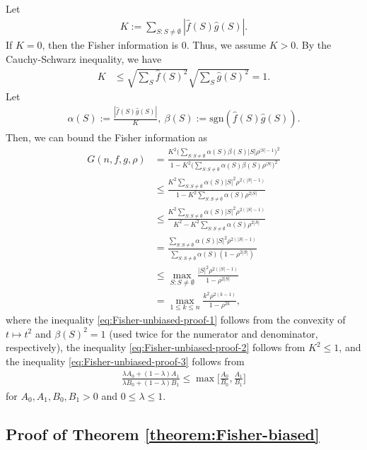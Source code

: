 \documentclass[journal,draftcls, onecolumn]{IEEEtran}
\newcommand{\qed}{\hfill \IEEEQED}
\newcommand{\rom}[1]{\mathrm{#1}}
\begin{document}
Let 
\begin{align}
K := \sum_{S: S\neq \emptyset}  |\widehat{f}(S) \widehat{g}(S)|.
\end{align}
If $K=0$, then the Fisher information is $0$. Thus, we assume $K > 0$. 
By the Cauchy-Schwarz inequality, we have
\begin{align}
K &\le \sqrt{\sum_S \widehat{f}(S)^2} \sqrt{\sum_S \widehat{g}(S)^2} =1.
\end{align}
Let 
\begin{align}
\alpha(S) := \frac{|\widehat{f}(S) \widehat{g}(S)|}{K},~\beta(S) := \rom{sgn}(\widehat{f}(S) \widehat{g}(S)).
\end{align}
Then, we can bound the Fisher information as
\begin{align}
G(n,f,g,\rho) &= \frac{K^2 \big(  \sum_{S: S\neq \emptyset} \alpha(S) \beta(S) |S|  \rho^{|S|-1}\big)^2}{1 - K^2 \big(\sum_{S: S\neq \emptyset} \alpha(S) \beta(S) \rho^{|S|}\big)^2} \\
&\le \frac{K^2 \sum_{S: S\neq \emptyset} \alpha(S)  |S|^2  \rho^{2(|S|-1)}}{1 - K^2 \sum_{S: S\neq \emptyset} \alpha(S)  \rho^{2|S|}} \label{eq:Fisher-unbiased-proof-1} \\
&\le \frac{K^2 \sum_{S: S\neq \emptyset} \alpha(S)  |S|^2  \rho^{2(|S|-1)}}{K^2 - K^2 \sum_{S: S\neq \emptyset} \alpha(S)  \rho^{2|S|}}  \label{eq:Fisher-unbiased-proof-2}  \\
&= \frac{ \sum_{S: S\neq \emptyset} \alpha(S)  |S|^2  \rho^{2(|S|-1)}}{  \sum_{S: S\neq \emptyset} \alpha(S) (1 -  \rho^{2|S|})} \\
&\le \max_{S: S\neq \emptyset} \frac{|S|^2 \rho^{2(|S|-1)}}{1 - \rho^{2|S|}} \label{eq:Fisher-unbiased-proof-3} \\
&= \max_{1\le k \le n} \frac{k^2 \rho^{2(k-1)}}{1-\rho^{2k}},
\end{align}
where the inequality \eqref{eq:Fisher-unbiased-proof-1} follows from the convexity 
of $t \mapsto t^2$ and $\beta(S)^2=1$ (used twice for the numerator and denominator, respectively),
the inequality \eqref{eq:Fisher-unbiased-proof-2} follows from $K^2 \le 1$, and the inequality \eqref{eq:Fisher-unbiased-proof-3} follows from
\begin{align} \label{eq:convex-max}
\frac{\lambda A_0 + (1-\lambda) A_1}{\lambda B_0 + (1-\lambda)B_1} \le \max\bigg[ \frac{A_0}{B_0}, \frac{A_1}{B_1} \bigg]
\end{align}
for $A_0,A_1,B_0,B_1 > 0$ and $0\le \lambda\le1$.
\qed

\subsection{Proof of Theorem \ref{theorem:Fisher-biased}} \label{subsec:proof-Fisher-biased}
\end{document}
